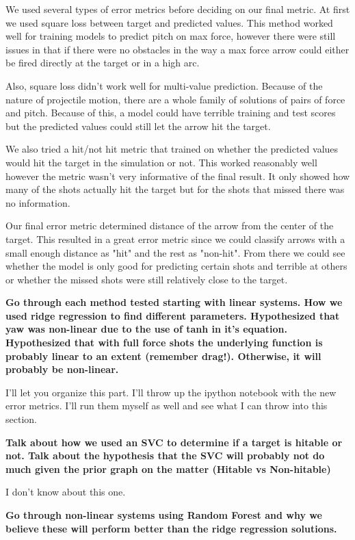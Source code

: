 \documentclass[twoside,twocolumn]{article}
\begin{document}
We used several types of error metrics before deciding on our final metric. At first we used square loss between target and predicted values. This method worked well for training models to predict pitch on max force, however there were still issues in that if there were no obstacles in the way a max force arrow could either be fired directly at the target or in a high arc.

Also, square loss didn't work well for multi-value prediction. Because of the nature of projectile motion, there are a whole family of solutions of pairs of force and pitch. Because of this, a model could have terrible training and test scores but the predicted values could still let the arrow hit the target.

We also tried a hit/not hit metric that trained on whether the predicted values would hit the target in the simulation or not. This worked reasonably well however the metric wasn't very informative of the final result. It only showed how many of the shots actually hit the target but for the shots that missed there was no information.

Our final error metric determined distance of the arrow from the center of the target. This resulted in a great error metric since we could classify arrows with a small enough distance as "hit" and the rest as "non-hit". From there we could see whether the model is only good for predicting certain shots and terrible at others or whether the missed shots were still relatively close to the target.

\textbf{Go through each method tested starting with linear systems.
How we used ridge regression to find different parameters.
Hypothesized that yaw was non-linear due to the use of tanh in it's equation.
Hypothesized that with full force shots the underlying function is probably linear to an extent (remember drag!). Otherwise, it will probably be non-linear.}

I'll let you organize this part. I'll throw up the ipython notebook with the new error metrics. I'll run them myself as well and see what I can throw into this section.

\textbf{Talk about how we used an SVC to determine if a target is hitable or not.
Talk about the hypothesis that the SVC will probably not do much given the prior graph on the matter (Hitable vs Non-hitable)}

I don't know about this one.

\textbf{Go through non-linear systems using Random Forest and why we believe these will perform better than the ridge regression solutions.}
\end{document}
